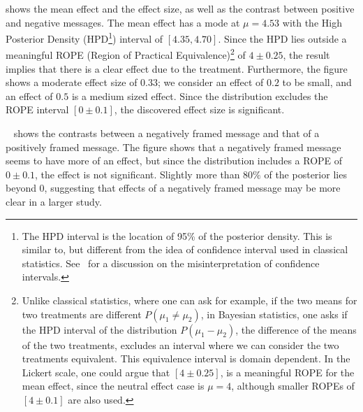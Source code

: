  shows the mean effect and the effect size, as well as the contrast between positive and negative messages. The mean effect has a mode at $\mu=4.53$ with the High Posterior Density (HPD\footnote{The HPD interval is the location of 95\% of the posterior density. This is similar to, but different from the idea of confidence interval used in classical statistics. See~\textcite{Hoekstra2014} for a discussion on the misinterpretation of confidence intervals.}) interval of $[4.35, 4.70]$. Since the HPD lies outside a meaningful ROPE (Region of Practical Equivalence)\footnote{Unlike classical statistics, where one can ask for example, if the two means for two treatments are different $P(\mu_1\neq \mu_2)$, in Bayesian statistics, one asks if the HPD interval of the distribution $P(\mu_1-\mu_2)$, the difference of the means of the two treatments, excludes an interval where we can consider the two treatments equivalent. This equivalence interval is domain dependent. In the Lickert scale, one could argue that $[4 \pm 0.25]$, is a meaningful ROPE for the mean effect, since the neutral effect case is $\mu=4$, although smaller ROPEs of $[4 \pm 0.1]$ are also used.} of $4 \pm 0.25$, the result implies that there is a clear effect due to the treatment. Furthermore, the figure shows a moderate effect size of $0.33$; we consider an effect of $0.2$ to be small, and an effect of $0.5$ is a medium sized effect. Since the distribution excludes the ROPE interval $[0 \pm 0.1]$, the discovered effect size is significant.


~ shows the contrasts between a negatively framed message and that of a positively framed message. The figure shows that a negatively framed message seems to have more of an effect, but since the distribution includes a ROPE of $0 \pm 0.1$, the effect is not significant. Slightly more than $80\%$ of the posterior lies beyond 0, suggesting that effects of a negatively framed message may be more clear in a larger study.



